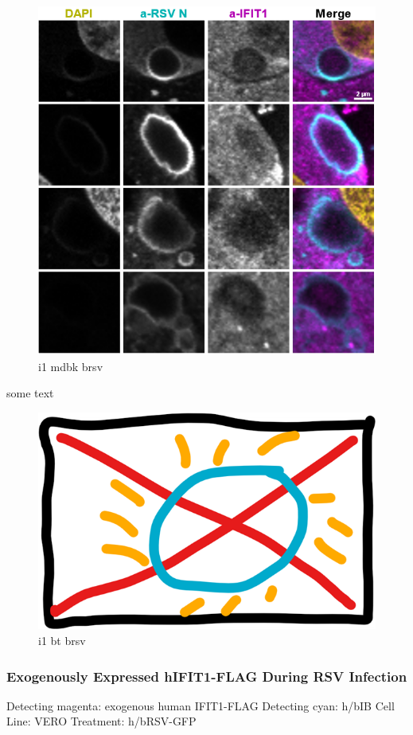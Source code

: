 \begin{figure}
    \centering
    \includegraphics[width=1\linewidth]{08. Chapter 3/Figs/02. IFIT1/06. mdbk brsv.png}
    \caption[i1 mdbk brsv]{i1 mdbk brsv}
    \label{i1 mdbk brsv}
\end{figure}

some text

\begin{figure}
    \centering
    \includegraphics[width=0.5\linewidth]{06. Chapter 1//Figs/00. placeholder.png}
    \caption[i1 bt brsv]{i1 bt brsv}
    \label{i1 bt brsv}
\end{figure}

\subsubsection{Exogenously Expressed hIFIT1-FLAG During RSV Infection} \label{Exogenously Expressed hIFIT1-FLAG During RSV Infection}
Detecting magenta: exogenous human IFIT1-FLAG \newline
Detecting cyan: h/bIB \newline
Cell Line: VERO \newline
Treatment: h/bRSV-GFP \newline

